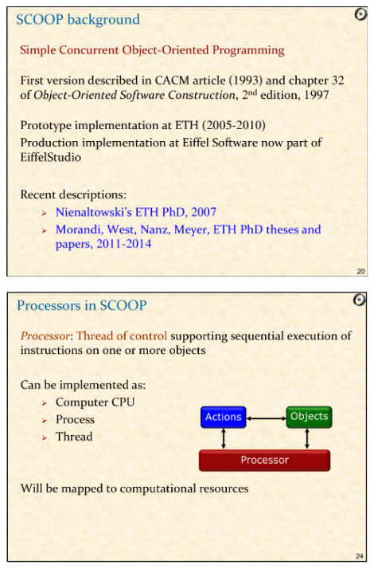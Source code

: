 \documentclass[xetex,mathserif,serif]{beamer}
\begin{document}
	\begin{frame}
		\begin{center}
			\includegraphics[width=0.9\textwidth]{meyer2.png}
		\end{center}
	\end{frame}

	\begin{frame}
		\begin{center}
			\includegraphics[width=0.9\textwidth]{meyer3.png}
		\end{center}
	\end{frame}
\end{document}
